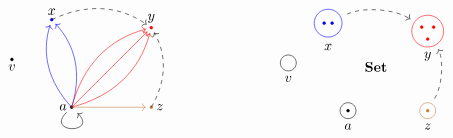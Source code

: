 \documentclass[DaoFP]{subfiles}
\begin{document}
\[
\begin{tikzpicture}
\def\ax{0}
\def\ay{0.5}
\def\xx{-0.5}
\def\xy{2.7}
\def\yx{2}
\def\yy{2.5}
\def\zx{2}
\def\zy{0.5}
\def\vx{-1.5}
\def\vy{1.7}
\filldraw[black] (\ax, \ay) circle (1 pt);
\node (a) at (\ax, \ay) {};
\node[left] at (\ax, \ay) {$a$};
\filldraw[blue] (\xx, \xy) circle (1 pt);
\node[above] at (\xx, \xy) {$x$};
\filldraw[red] (\yx, \yy) circle (1 pt);
\node[above] at (\yx, \yy) {$y$};
\filldraw[brown] (\zx, \zy) circle (1 pt);
\node[right] at (\zx, \zy) {$z$};
\filldraw[black] (\vx, \vy) circle (1 pt);
\node[below] at (\vx, \vy) {$v$};

\draw [->] (a) edge[out=225, in=315, loop] (a);

\draw[dashed] (\xx, \xy) edge[->, bend left, shorten > = 4 pt] (\yx, \yy);
\draw[dashed] (\zx, \zy) edge[->, bend right, shorten > = 4 pt] (\yx, \yy);

\draw[blue] (\ax, \ay) edge[->, bend left, shorten > = 4 pt] (\xx, \xy);
\draw[blue] (\ax, \ay) edge[->, bend right, shorten > = 4 pt] (\xx, \xy);

\draw[red] (\ax, \ay) edge[->, bend left, shorten > = 4 pt] (\yx, \yy);
\draw[red] (\ax, \ay) edge[->, bend right, shorten > = 4 pt] (\yx, \yy);
\draw[red] (\ax, \ay) edge[->, shorten > = 4 pt] (\yx, \yy);

\draw[brown] (\ax, \ay) edge[->, shorten > = 4 pt] (\zx, \zy);
\end{tikzpicture}
\hspace{80pt}
\begin{tikzpicture}
\def\ax{0}
\def\ay{0.5}
\def\xx{-0.5}
\def\xy{2.7}
\def\yx{2}
\def\yy{2.5}
\def\zx{2}
\def\zy{0.5}
\def\vx{-1.5}
\def\vy{1.7}
\def\sx{0.7}
\def\sy{1.6}

\node at (\sx, \sy) {$\Set$};

\draw[black] (\vx, \vy) circle (0.2);
\node[below] at (\vx, \vy - 0.2) {$v$};

\draw[black] (\ax, \ay) circle (0.2);
\filldraw[black] (\ax, \ay) circle (1 pt);
\node[below] at (\ax, \ay-0.2) {$a$};

\draw[blue] (\xx, \xy) circle (0.35);
\filldraw[blue] (\xx - 0.1, \xy) circle (1 pt);
\filldraw[blue] (\xx + 0.1, \xy) circle (1 pt);
\node[above] at (\xx, \xy - 0.8) {$x$};

\draw[red] (\yx, \yy) circle (0.4);
\filldraw[red] (\yx-0.15, \yy+0.1) circle (1 pt);
\filldraw[red] (\yx+0.15, \yy+0.1) circle (1 pt);
\filldraw[red] (\yx, \yy-0.2) circle (1 pt);
\node[below] at (\yx, \yy - 0.4) {$y$};

\draw[brown] (\zx, \zy) circle (0.2);
\filldraw[brown] (\zx, \zy) circle (1 pt);
\node[below] at (\zx, \zy - 0.2) {$z$};

\draw[dashed] (\xx, \xy) edge[->, bend left, shorten > = 15, shorten < = 15] (\yx, \yy);
\draw[dashed] (\zx, \zy) edge[->, bend right, shorten > = 15, shorten < = 10] (\yx, \yy);

\end{tikzpicture}
\]
\end{document}
